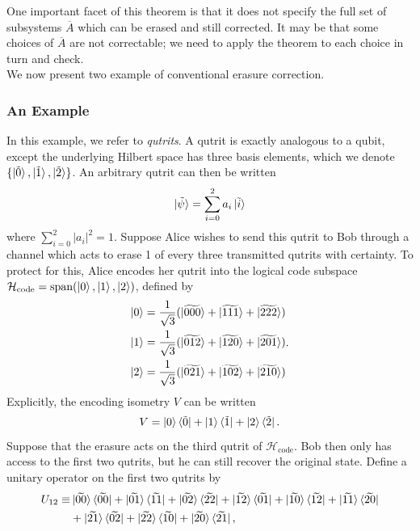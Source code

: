 \documentclass[12pt,a4paper]{report}
\numberwithin{equation}{section}
\newcommand{\ketbra}[2]{\ket{#1}\bra{#2}}
\newcommand{\ketbras}[1]{\ketbra{#1}{#1}}
\newcommand{\Hcode}{\mathcal{H}_{\text{code}}}
\newcommand{\ol}[1]{\overline{#1}}
\theoremstyle{definition}
\theoremstyle{theorem}
\theoremstyle{theorem}
\theoremstyle{example}
\theoremstyle{definition}
\begin{document}
One important facet of this theorem is that it does not specify the full set of subsystems $\ol{A}$ which can be erased and still corrected. It may be that some choices of $\ol{A}$ are not correctable; we need to apply the theorem to each choice in turn and check.\\
We now present two example of conventional erasure correction.
\subsubsection{An Example}
In this example, we refer to \textit{qutrits}. A qutrit is exactly analogous to a qubit, except the underlying Hilbert space has three basis elements, which we denote $\{\ket{\tilde{0}},\ket{\tilde{1}},\ket{\tilde{2}}\}$. An arbitrary qutrit can then be written
\begin{equation}
	\ket{\tilde{\psi}}=\sum_{i=0}^{2}a_{i}\ket{\tilde{i}}
\end{equation}
where $\sum_{i=0}^{2}|a_{i}|^{2}=1$. Suppose Alice wishes to send this qutrit to Bob through a channel which acts to erase 1 of every three transmitted qutrits with certainty. To protect for this, Alice encodes her qutrit into the logical code subspace $\Hcode=\text{span}(\ket{0},\ket{1},\ket{2})$, defined by
\begin{equation}
	\begin{aligned}
		\ket{0}&=\frac{1}{\sqrt{3}}(\ket{\widetilde{000}}+\ket{\widetilde{111}}+\ket{\widetilde{222}})\\
		\ket{1}&=\frac{1}{\sqrt{3}}(\ket{\widetilde{012}}+\ket{\widetilde{120}}+\ket{\widetilde{201}})\\
		\ket{2}&=\frac{1}{\sqrt{3}}(\ket{\widetilde{021}}+\ket{\widetilde{102}}+\ket{\widetilde{210}})
	\end{aligned}.
\end{equation}
Explicitly, the encoding isometry $V$ can be written
\begin{equation}
	V=\ket{0}\bra{\tilde{0}}+\ket{1}\bra{\tilde{1}}+\ket{2}\bra{\tilde{2}}.
\end{equation}
Suppose that the erasure acts on the third qutrit of $\Hcode$. Bob then only has access to the first two qutrits, but he can still recover the original state. Define a unitary operator on the first two qutrits by
\begin{equation}\label{unitary}
	\begin{aligned}
		U_{12}\equiv&\ketbras{\widetilde{00}}+\ketbra{\widetilde{01}}{\widetilde{11}}+\ketbra{\widetilde{02}}{\widetilde{22}}+\ketbra{\widetilde{12}}{\widetilde{01}}+\ketbra{\widetilde{10}}{\widetilde{12}}+\ketbra{\widetilde{11}}{\widetilde{20}}\\&+\ketbra{\widetilde{21}}{\widetilde{02}}+\ketbra{\widetilde{22}}{\widetilde{10}}+\ketbra{\widetilde{20}}{\widetilde{21}},
	\end{aligned}
\end{equation}
\end{document}
